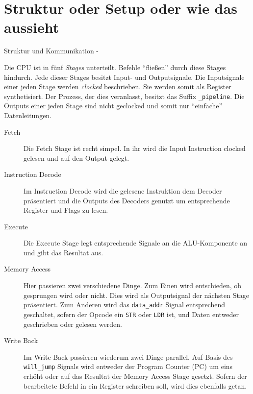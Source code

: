 \documentclass[paper=a4,fontsize=12pt,twocolumn]{scrreprt}
\begin{document}
\section{Struktur oder Setup oder wie das aussieht}
Struktur und Kommunikation -


Die CPU ist in fünf \textit{Stages} unterteilt.
Befehle \enquote{fließen} durch diese Stages hindurch.
Jede dieser Stages besitzt Input- und Outputsignale.
Die Inputsignale einer jeden Stage werden \textit{clocked} beschrieben.
Sie werden somit als Register synthetisiert.
Der Prozess, der dies veranlasst, besitzt das Suffix \texttt{\_pipeline}.
Die Outputs einer jeden Stage sind nicht geclocked und somit nur \enquote{einfache} Datenleitungen.

\begin{description}
  \item[Fetch]
  Die Fetch Stage ist recht simpel.
  In ihr wird die Input Instruction clocked gelesen und auf den Output gelegt.
  \item[Instruction Decode]
  Im Instruction Decode wird die gelesene Instruktion dem Decoder präsentiert und die Outputs des Decoders genutzt um entsprechende Register und Flags zu lesen.
  \item[Execute]
  Die Execute Stage legt entsprechende Signale an die ALU-Komponente an und gibt das Resultat aus.
  \item[Memory Access]
  Hier passieren zwei verschiedene Dinge.
  Zum Einen wird entschieden, ob gesprungen wird oder nicht.
  Dies wird als Outputsignal der nächsten Stage präsentiert.
  Zum Anderen wird das \texttt{data\_addr} Signal entsprechend geschaltet, sofern der Opcode ein \texttt{STR} oder \texttt{LDR} ist, und Daten entweder geschrieben oder gelesen werden.
  \item[Write Back]
  Im Write Back passieren wiederum zwei Dinge parallel.
  Auf Basis des \texttt{will\_jump} Signals wird entweder der Program Counter (PC) um eins erhöht oder auf das Resultat der Memory Access Stage gesetzt.
  Sofern der bearbeitete Befehl in ein Register schreiben soll, wird dies ebenfalls getan.
\end{description}
\end{document}
